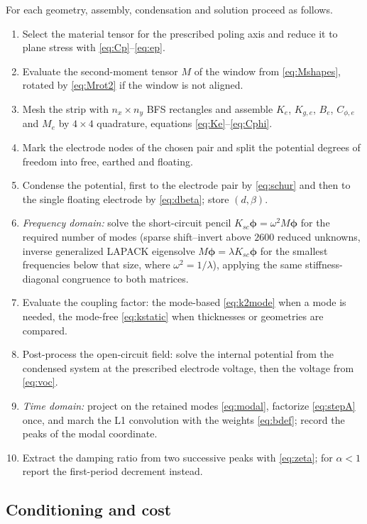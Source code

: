 For each geometry, assembly, condensation and solution proceed as follows.
\begin{enumerate}
\item Select the material tensor for the prescribed poling axis and
  reduce it to plane stress with
  \eqref{eq:Cp}--\eqref{eq:ep}.
\item Evaluate the second-moment tensor $M$ of the window from
  \eqref{eq:Mshapes}, rotated by \eqref{eq:Mrot2} if the window is not aligned.
\item Mesh the strip with $n_x\times n_y$ BFS rectangles and assemble
  $K_e$, $K_{g,e}$, $B_e$, $C_{\phi,e}$ and $M_e$ by $4\times4$ quadrature,
  equations \eqref{eq:Ke}--\eqref{eq:Cphi}.
\item Mark the electrode nodes of the chosen pair and split the potential
  degrees of freedom into free, earthed and floating.
\item Condense the potential, first to the electrode pair by \eqref{eq:schur}
  and then to the single floating electrode by \eqref{eq:dbeta}; store
  $(d,\beta)$.
\item \emph{Frequency domain:} solve the short-circuit pencil
  $K_{sc}\bm{\phi}=\omega^{2}M\bm{\phi}$ for the required number of modes
  (sparse shift--invert above $2600$ reduced unknowns, inverse generalized
  LAPACK eigensolve $M\bm{\phi}=\lambda K_{sc}\bm{\phi}$ for the
  smallest frequencies below that size, where $\omega^2=1/\lambda$),
  applying the same stiffness-diagonal congruence to both matrices.
\item Evaluate the coupling factor: the mode-based \eqref{eq:k2mode} when a
  mode is needed, the mode-free \eqref{eq:kstatic} when thicknesses or
  geometries are compared.
\item Post-process the open-circuit field: solve the internal potential from
  the condensed system at the prescribed electrode voltage, then the voltage
  from \eqref{eq:voc}.
\item \emph{Time domain:} project on the retained modes \eqref{eq:modal},
  factorize \eqref{eq:stepA} once, and march the L1 convolution with the
  weights \eqref{eq:bdef}; record the peaks of the modal coordinate.
\item Extract the damping ratio from two successive peaks with
  \eqref{eq:zeta}; for $\alpha<1$ report the first-period decrement instead.
\end{enumerate}

\FloatBarrier
\subsection{Conditioning and cost}
\label{sec:implementation}

